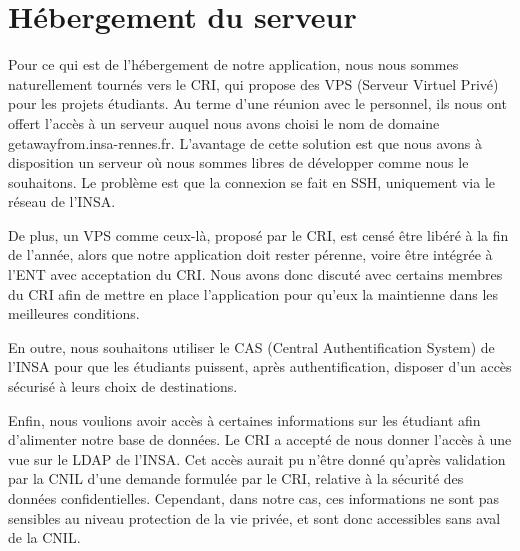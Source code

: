 \section{Hébergement du serveur}

Pour ce qui est de l'hébergement de notre application, nous nous sommes naturellement tournés vers le CRI, qui propose des VPS (Serveur Virtuel Privé) pour les projets étudiants. Au terme d'une réunion avec le personnel, ils nous ont offert l'accès à un serveur auquel nous avons choisi le nom de domaine getawayfrom.insa-rennes.fr. L'avantage de cette solution est que nous avons à disposition un serveur où nous sommes libres de développer comme nous le souhaitons. Le problème est que la connexion se fait en SSH, uniquement via le réseau de l'INSA. 

De plus, un VPS comme ceux-là, proposé par le CRI, est censé être libéré à la fin de l'année, alors que notre application doit rester pérenne, voire être intégrée à l'ENT avec acceptation du CRI. Nous avons donc discuté avec certains membres du CRI afin de mettre en place l'application pour qu'eux la maintienne dans les meilleures conditions.

\medbreak

En outre, nous souhaitons utiliser le CAS (Central Authentification System) de l'INSA pour que les étudiants puissent, après authentification, disposer d'un accès sécurisé à leurs choix de destinations.

Enfin, nous voulions avoir accès à certaines informations sur les étudiant afin d'alimenter notre base de données. Le CRI a accepté de nous donner l'accès à une vue sur le LDAP de l'INSA. Cet accès aurait pu n'être donné qu'après validation par la CNIL d'une demande formulée par le CRI, relative à la sécurité des données confidentielles. Cependant, dans notre cas, ces informations ne sont pas sensibles au niveau protection de la vie privée, et sont donc accessibles sans aval de la CNIL.